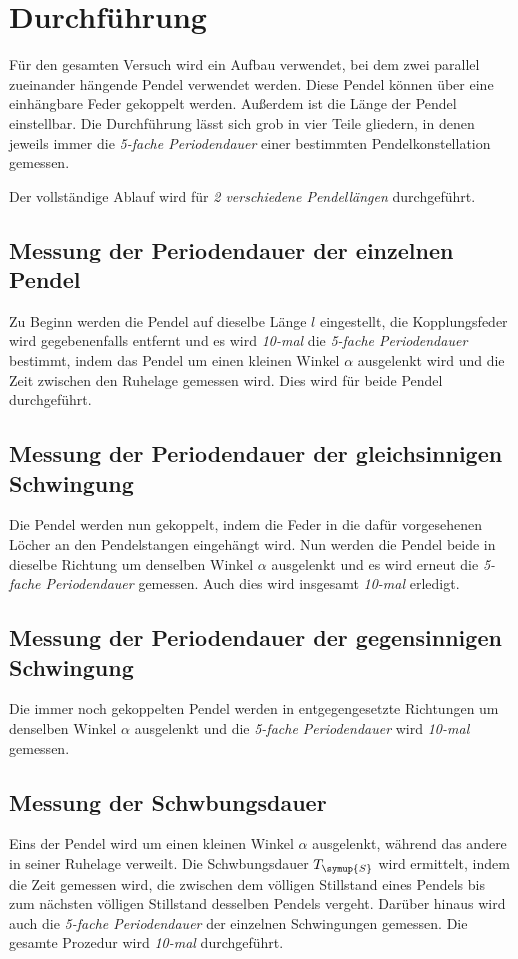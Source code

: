 \section{Durchführung}
\label{sec:Durchführung}
Für den gesamten Versuch wird ein Aufbau verwendet, bei dem zwei parallel zueinander hängende Pendel verwendet werden. Diese Pendel können über
eine einhängbare Feder gekoppelt werden. Außerdem ist die Länge der Pendel einstellbar.
Die Durchführung lässt sich grob in vier Teile gliedern, in denen jeweils immer die \textit{5-fache Periodendauer} einer bestimmten Pendelkonstellation
gemessen.

Der vollständige Ablauf wird für \textit{2 verschiedene Pendellängen} durchgeführt.


\subsection{Messung der Periodendauer der einzelnen Pendel}
Zu Beginn werden die Pendel auf dieselbe Länge $l$ eingestellt, die Kopplungsfeder wird gegebenenfalls entfernt und es wird \textit{10-mal} die 
\textit{5-fache Periodendauer} bestimmt, indem das Pendel um einen kleinen Winkel $\alpha$ ausgelenkt wird und die Zeit zwischen den Ruhelage 
gemessen wird. Dies wird für beide Pendel durchgeführt.

\subsection{Messung der Periodendauer der gleichsinnigen Schwingung}
Die Pendel werden nun gekoppelt, indem die Feder in die dafür vorgesehenen Löcher an den Pendelstangen eingehängt wird. Nun werden die Pendel beide 
in dieselbe Richtung um denselben Winkel $\alpha$ ausgelenkt und es wird erneut die \textit{5-fache Periodendauer} gemessen. Auch dies wird 
insgesamt \textit{10-mal} erledigt.

\subsection{Messung der Periodendauer der gegensinnigen Schwingung}
Die immer noch gekoppelten Pendel werden in entgegengesetzte Richtungen um denselben Winkel $\alpha$ ausgelenkt und die \textit{5-fache Periodendauer}
wird \textit{10-mal} gemessen.

\subsection{Messung der Schwbungsdauer}
Eins der Pendel wird um einen kleinen Winkel $\alpha$ ausgelenkt, während das andere in seiner Ruhelage verweilt. Die Schwbungsdauer $T_{\symup{S}}$ wird
ermittelt, indem die Zeit gemessen wird, die zwischen dem völligen Stillstand eines Pendels bis zum nächsten völligen Stillstand desselben Pendels vergeht.
Darüber hinaus wird auch die \textit{5-fache Periodendauer} der einzelnen Schwingungen gemessen. Die gesamte Prozedur wird \textit{10-mal} durchgeführt.